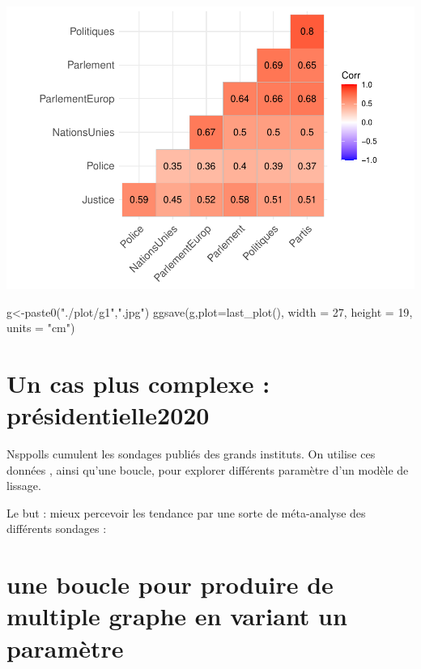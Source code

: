 \documentclass[
]{book}
\newenvironment{Shaded}{\begin{snugshade}}{\end{snugshade}}
\newcommand{\AttributeTok}[1]{\textcolor[rgb]{0.77,0.63,0.00}{#1}}
\newcommand{\DecValTok}[1]{\textcolor[rgb]{0.00,0.00,0.81}{#1}}
\newcommand{\FunctionTok}[1]{\textcolor[rgb]{0.00,0.00,0.00}{#1}}
\newcommand{\NormalTok}[1]{#1}
\newcommand{\OtherTok}[1]{\textcolor[rgb]{0.56,0.35,0.01}{#1}}
\newcommand{\StringTok}[1]{\textcolor[rgb]{0.31,0.60,0.02}{#1}}
\begin{document}
\includegraphics{bookdown-demo_files/figure-latex/0505-1.pdf}

\begin{Shaded}
\begin{Highlighting}[]
\NormalTok{g}\OtherTok{\textless{}{-}}\FunctionTok{paste0}\NormalTok{(}\StringTok{"./plot/g1"}\NormalTok{,}\StringTok{".jpg"}\NormalTok{)}
\FunctionTok{ggsave}\NormalTok{(g,}\AttributeTok{plot=}\FunctionTok{last\_plot}\NormalTok{(), }\AttributeTok{width =} \DecValTok{27}\NormalTok{, }\AttributeTok{height =} \DecValTok{19}\NormalTok{, }\AttributeTok{units =} \StringTok{"cm"}\NormalTok{)}
\end{Highlighting}
\end{Shaded}

\hypertarget{un-cas-plus-complexe-pruxe9sidentielle2020}{%
\section{Un cas plus complexe : présidentielle2020}\label{un-cas-plus-complexe-pruxe9sidentielle2020}}

Nsppolls cumulent les sondages publiés des grands instituts. On utilise ces données , ainsi qu'une boucle, pour explorer différents paramètre d'un modèle de lissage.

Le but : mieux percevoir les tendance par une sorte de méta-analyse des différents sondages :

\hypertarget{une-boucle-pour-produire-de-multiple-graphe-en-variant-un-paramuxe8tre}{%
\section{une boucle pour produire de multiple graphe en variant un paramètre}\label{une-boucle-pour-produire-de-multiple-graphe-en-variant-un-paramuxe8tre}}
\end{document}
